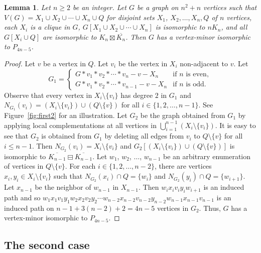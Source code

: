 \documentclass[11pt]{article}
\newtheorem{lemma}[theorem]{Lemma}
\newcommand\mat{\boxminus}
\newcommand\antimat{\boxtimes}
\def\S_#1{\overline{K_{#1}}}
\begin{document}
      \begin{lemma}\label{lem:first2}
      Let $n\ge 2$ be an integer.
        Let $G$ be a graph on $n^2+n$ vertices such that 
        $V(G)=X_1\cup X_2\cup\cdots \cup X_n\cup Q$
        for disjoint sets $X_1$, $X_2,\ldots, X_n,Q$ of $n$ vertices,
        each $X_i$ is a clique in $G$,
        $G[X_1\cup X_2\cup \cdots \cup X_n]$ is isomorphic to $nK_n$,
        and all $G[X_i\cup Q]$ are isomorphic to  $K_n\antimat \S_n$.
        Then $G$ has a vertex-minor isomorphic to $P_{4n-5}$.
      \end{lemma}
      \begin{proof}
        Let $v$ be a vertex in $Q$.
        Let $v_i$ be the vertex in $X_i$ non-adjacent to $v$.
        Let \[
          G_1=
        \begin{cases}
          G*v_1*v_2*\cdots*v_n-v-X_n &\text{if $n$ is even},\\
          G*v_1*v_2*\cdots*v_{n-1}-v-X_n&\text{if $n$ is odd.}
        \end{cases}
        \]
        Observe that every vertex in $X_i\setminus \{v_i\}$ has degree $2$ in $G_1$ and $N_{G_1}(v_i)=(X_i\setminus\{v_i\})\cup (Q\setminus \{v\})$ 
        for all $i\in \{1,2,\ldots,n-1\}$. See Figure~\ref{fig:first2} for an illustration.
        Let $G_2$ be the graph obtained from $G_1$ by applying local complementations at all vertices in $\bigcup_{i=1}^{n-1} (X_i\setminus\{v_i\})$.
        It is easy to see that $G_2$ is obtained from $G_1$ by deleting 
        all edges from $v_i$ to $Q\setminus \{v\}$ for all $i\le n-1$.
        Then $N_{G_2}(v_i)=X_i\setminus \{v_i\}$ and $G_2[(X_i\setminus\{v_i\})\cup (Q\setminus \{v\})]$ is isomorphic to $\S_{n-1}\mat \S_{n-1}$.
        Let $w_1$, $w_2$, $\ldots$, $w_{n-1}$ be an arbitrary enumeration of vertices in $Q\setminus\{v\}$.
        For each $i\in\{1,2,\ldots,n-2\}$, there are vertices $x_i,y_i\in X_i\setminus\{v_i\}$
        such that $N_{G_2}(x_i)\cap Q=\{w_i\}$ and $N_{G_2}(y_{i})\cap Q=\{w_{i+1}\}$.
        Let $x_{n-1}$ be the neighbor of $w_{n-1}$ in $X_{n-1}$.
        Then $w_ix_iv_iy_iw_{i+1}$ is an induced path and so 
        $w_1x_1v_1y_1w_2x_2v_2y_2\cdots w_{n-2}x_{n-2}v_{n-2}y_{n-2}w_{n-1}x_{n-1}v_{n-1}$
        is an induced path on $n-1+3(n-2)+2=4n-5$ vertices in $G_2$. 
        Thus, $G$ has a vertex-minor isomorphic to $P_{4n-5}$.
      \end{proof}
      

	
	\subsection{The second case}\label{subsec:dcm}
\end{document}
